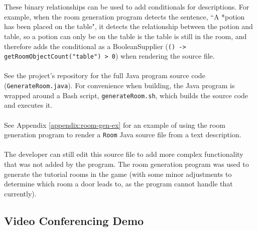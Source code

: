 \documentclass[11pt]{article}
\begin{document}
\\
\\
These binary relationships can be used to add conditionals for descriptions. For example, when the room generation program detects the sentence, ``A *potion has been placed on the table", it detects the relationship between the potion and table, so a potion can only be on the table is the table is still in the room, and therefore adds the conditional as a BooleanSupplier (\texttt{() -> getRoomObjectCount("table") > 0}) when rendering the source file.
\\
\\
See the project's repository for the full Java program source code (\texttt{GenerateRoom.java}). For convenience when building, the Java program is wrapped around a Bash script, \texttt{generateRoom.sh}, which builds the source code and executes it.
\\
\\
See Appendix \ref{appendix:room-gen-ex} for an example of using the room generation program to render a \texttt{Room} Java source file from a text description.
\\
\\
The developer can still edit this source file to add more complex functionality that was not added by the program. The room generation program was used to generate the tutorial rooms in the game (with some minor adjustments to determine which room a door leads to, as the program cannot handle that currently).

\subsection{Video Conferencing Demo}
\label{section:calling-demo}
\end{document}

